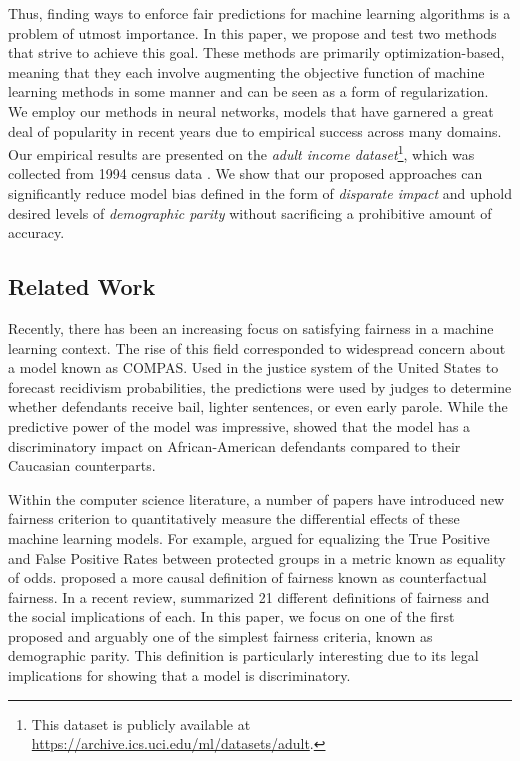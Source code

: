 \documentclass{article}
\begin{document}
Thus, finding ways to enforce fair predictions for machine learning algorithms is a problem of utmost importance.  In this paper, we propose and test two methods that strive to achieve this goal.  These methods are primarily optimization-based, meaning that they each involve augmenting the objective function of machine learning methods in some manner and can be seen as a form of regularization.  We employ our methods in neural networks, models that have garnered a great deal of popularity in recent years due to empirical success across many domains.  Our empirical results are presented on the \emph{adult income dataset}\footnote{This dataset is publicly available at \url{https://archive.ics.uci.edu/ml/datasets/adult}.}, which was collected from 1994 census data \citep{kohavi1996scaling}.  We show that our proposed approaches can significantly reduce model bias defined in the form of \emph{disparate impact} and uphold desired levels of \emph{demographic parity} without sacrificing a prohibitive amount of accuracy.             

\subsection{Related Work}
Recently, there has been an increasing focus on satisfying fairness in a machine learning context. The rise of this field corresponded to widespread concern about a model known as COMPAS. Used in the justice system of the United States to forecast recidivism probabilities, the predictions were used by judges to determine whether defendants receive bail, lighter sentences, or even early parole. While the predictive power of the model was impressive, \citet{angwin2016machine} showed that the model has a discriminatory impact on African-American defendants compared to their Caucasian counterparts. 

Within the computer science literature, a number of papers have introduced new fairness criterion to quantitatively measure the differential effects of these machine learning models. For example, \citet{hardt2016equality} argued for equalizing the True Positive and False Positive Rates between protected groups in a metric known as equality of odds. \citet{kusner2017counterfactual} proposed a more causal definition of fairness known as counterfactual fairness. In a recent review, \citet{narayanan} summarized 21 different definitions of fairness and the social implications of each. In this paper, we focus on one of the first proposed and arguably one of the simplest fairness criteria, known as demographic parity. This definition is particularly interesting due to its legal implications for showing that a model is discriminatory.
\end{document}
